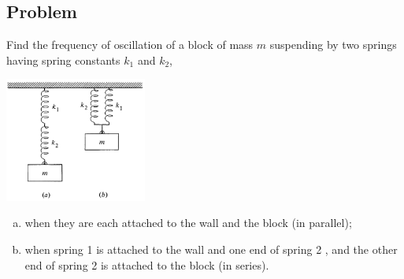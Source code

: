 \documentclass[solutions]{esg8012pset}
\begin{document}
\subsection{Problem}
  Find the frequency of oscillation of a block of mass $m$ suspending by two springs having spring constants $k_1$ and $k_2$,
  \begin{center}\includegraphics[width=0.35\textwidth]{ps03_4}\end{center}
  \begin{enumerate}[a)]
    \item when they are each attached to the wall and the block (in parallel);
    \item when spring 1 is attached to the wall and one end of spring 2 , and the other end of spring 2 is attached to the block (in series).
  \end{enumerate}
\end{document}
